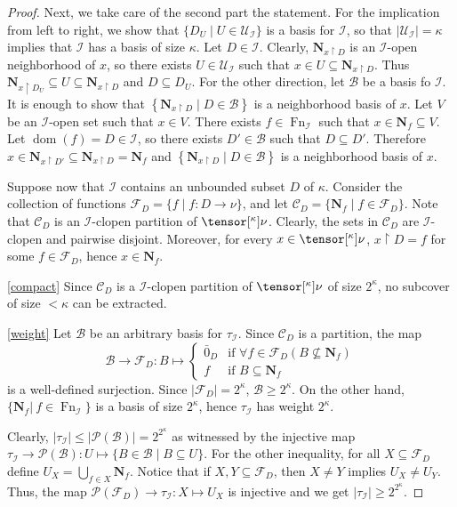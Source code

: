 \documentclass{amsart}
\numberwithin{equation}{section}
\newcommand{\B}{\mathcal{B}}
\newcommand{\C}{\mathcal{C}}
\newcommand{\F}{\mathcal{F}}
\newcommand{\I}{\mathcal{I}}
\newcommand{\U}{\mathcal{U}}
\newcommand{\pre}[2]{\tensor[^{#1}]{#2}{}}
\newcommand{\Nbhd}{\boldsymbol{N}}
\newcommand{\1}{\mathbf{I}}
\newcommand{\2}{\mathbf{II}}
\renewcommand{\k}{\kappa}
\newcommand{\pow}{\mathscr{P}}
\DeclareMathOperator{\dom}{dom}
\DeclareMathOperator{\Fn}{Fn}
\newcommand{\clopen}[1]{\Nbhd_{#1}}
\theoremstyle{definition}
\theoremstyle{remark}
\begin{document}
\begin{proof}
Next, we take care of the second part the statement. For the implication from left to right, we show that \(\{D_U \mid U \in \U_\I\}\) is a basis for \(\I\), so that \( |\U_\I|= \k\) implies that \(\I\) has a basis of size \(\k\).
Let \(D \in \I\). Clearly, \(\clopen{x \restriction D}\) is an \(\I\)-open neighborhood of $x$, so there exists \(U \in \U_\I\) such that \(x \in U \subseteq \clopen{x \restriction D}\). Thus \(\clopen{x \restriction D_U} \subseteq U \subseteq  \clopen{x \restriction D}\) and \(D \subseteq D_U\).
For the other direction, let \(\B\) be a basis fo \(\I\). It is enough to show that \(\left\lbrace \clopen{x\restriction D}  \mid D \in \B \right\rbrace \) is a neighborhood basis of $x$. Let $V$ be an \(\I\)-open set such that \(x \in V\). There exists \(f \in \Fn_\I\) such that \(x \in \Nbhd_f\subseteq V\). Let \(\dom (f) = D \in \I\), so there exists \(D' \in \B\) such that \(D \subseteq D'\). Therefore \(x \in \clopen{x \restriction D'} \subseteq \clopen{x \restriction D}= \clopen{f}\) and \(\left\lbrace \clopen{x\restriction D}  \mid D \in \B \right\rbrace \) is a neighborhood basis of $x$. 

\smallskip
Suppose now that \(\I\) contains an unbounded subset \(D\) of \(\k\).  Consider the collection of functions \(\F_D=\{f \mid f: D \to \nu\}\), and let \( \C_D= \{\clopen{f} \mid f \in \F_D\}\). Note that \(\C_D\) is an \(\I\)-clopen partition of \(\pre{\k}{\nu}\). Clearly, the sets in \(\C_D\) are \(\I\)-clopen and pairwise disjoint. Moreover, for every \(x \in \pre{\k}{\nu}\), \(x\restriction D=f\) for some \(f \in \F_D\), hence \(x \in \clopen{f}\).

 \ref{compact}  
 Since \( \C_D \) 
 is a \(\I\)-clopen partition of \(\pre{\k}{\nu}\) of size \(2^\k\), no subcover of size \(<\k\) can be extracted.
 
 \ref{weight} Let \(\B\) be an arbitrary basis for \(\tau_\I\). Since $\C_D$ is a partition, the map
\[
\B \to \F_D: B \mapsto \begin{cases}
  \bar{0}_{D} & \text{if } \forall f \in \F_D (B \not\subseteq \clopen{f}) \\
  f & \text{if } B \subseteq \clopen{f}
  \end{cases}
\]
is a well-defined surjection. Since \(|\F_D|=2^\k\), \(\B\ge 2^\k\). On the other hand, \(\{\clopen{f} | \ f \in \Fn_\I\}\) is a basis of size \(2^\k\), hence \(\tau_\I\) has weight \(2^\kappa\).

Clearly, \(|\tau_\I| \leq |\pow(\B)|=2^{2^\kappa}\) as witnessed by the injective map \(\tau_\I \to \pow(\B): U \mapsto \{B \in \B \mid B \subseteq U\}\).
For the other inequality, for all \(X \subseteq \F_D\) define \(U_X=\bigcup_{f \in X}\clopen{f}\). Notice that if $X,Y\subseteq \F_D$, then \(X \neq Y\) implies \(U_X \neq U_Y\). Thus, the map \(\pow(\F_D) \to \tau_\I: X \mapsto U_X\) is injective and we get \(|\tau_\I|\ge2^{2^\k}\). 


\end{proof}
\end{document}
